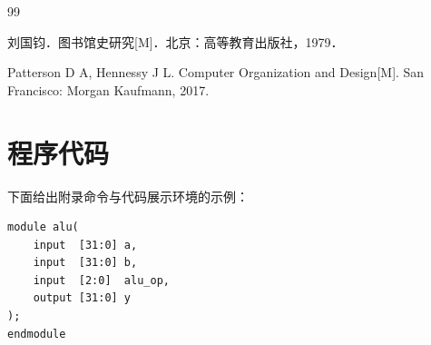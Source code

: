 \documentclass{hnnuthesis}
\begin{document}

\begin{thebibliography}{99}

刘国钧．图书馆史研究[M]．北京：高等教育出版社，1979．

Patterson D A, Hennessy J L. Computer Organization and Design[M]. San Francisco: Morgan Kaufmann, 2017.

\end{thebibliography}




\appendixpage

\section{程序代码}

下面给出附录命令与代码展示环境的示例：

\begin{verbatim}
module alu(
    input  [31:0] a,
    input  [31:0] b,
    input  [2:0]  alu_op,
    output [31:0] y
);
endmodule
\end{verbatim}
\end{document}
